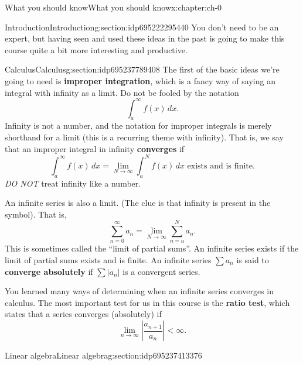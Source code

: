 \documentclass[oneside,10pt,]{book}
\newcommand{\terminology}[1]{\textbf{#1}}
\numberwithin{equation}{section}
\newcommand{\abs}[1]{\left\vert#1\right\vert}
\numberwithin{equation}{section}
\newcommand{\lt}{<}
\begin{document}
\begin{chapterptx}{What you should know}{}{What you should know}{}{}{x:chapter:ch-0}
\begin{sectionptx}{Introduction}{}{Introduction}{}{}{g:section:idp695222295440}
You don't need to be an expert, but having seen and used these ideas in the past is going to make this course quite a bit more interesting and productive.%
\end{sectionptx}
%
%
\typeout{************************************************}
\typeout{************************************************}
%
\begin{sectionptx}{Calculus}{}{Calculus}{}{}{g:section:idp695237789408}
The first of the basic ideas we're going to need is \terminology{improper integration}, which is a fancy way of saying an integral with infinity as a limit. Do not be fooled by the notation%
\begin{equation*}
\int_a^\infty f(x) \, dx.
\end{equation*}
Infinity is not a number, and the notation for improper integrals is merely shorthand for a limit (this is a recurring theme with infinity). That is, we say that an improper integral in infinity \terminology{converges} if%
\begin{equation*}
\int_a^\infty f(x) \, dx = \lim_{N \to \infty} \int_a^N f(x) \, dx \text{ exists and is finite}.
\end{equation*}
\emph{DO NOT} treat infinity like a number.%
\par
An infinite series is also a limit. (The clue is that infinity is present in the symbol). That is,%
\begin{equation*}
\sum_{n=0}^\infty a_n = \lim_{N \to \infty} \sum_{n=a}^N a_n.
\end{equation*}
This is sometimes called the ``limit of partial sums''. An infinite series exists if the limit of partial sums exists and is finite.    An infinite series \(\sum a_n\) is said to \terminology{converge absolutely} if \(\sum \abs{a_n}\) is a convergent series.%
\par
You learned many ways of determining when an infinite series converges in calculus. The most important test for us in this course is the \terminology{ratio test}, which states that a series converges (absolutely) if%
\begin{equation*}
\lim_{n \to \infty} \abs{\frac{a_{n+1}}{a_n}} \lt \infty.
\end{equation*}
%
\end{sectionptx}
%
%
\typeout{************************************************}
\typeout{************************************************}
%
\begin{sectionptx}{Linear algebra}{}{Linear algebra}{}{}{g:section:idp695237413376}

\end{sectionptx}
\end{chapterptx}
\end{document}
